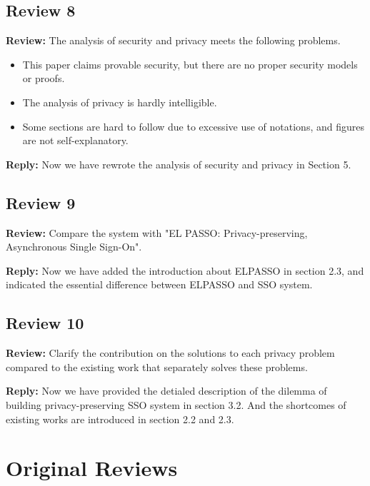 \documentclass[letterpaper,onecolumn,10pt]{article}
\begin{document}
\subsection*{Review 8}
\vspace{1mm}\noindent\textbf{Review:}
The analysis of security and privacy meets the following problems.
\begin{itemize}
 \item This paper claims provable security, but there are no proper security models or proofs.
 \item The analysis of privacy is hardly intelligible.
 \item Some sections are hard to follow due to excessive use of notations, and figures are not self-explanatory.
\end{itemize}

\vspace{1mm}\noindent\textbf{Reply:}
Now we have rewrote the analysis of security and privacy in Section 5.

\subsection*{Review 9}
\vspace{1mm}\noindent\textbf{Review:}
Compare the system with "EL PASSO: Privacy-preserving, Asynchronous Single Sign-On".

\vspace{1mm}\noindent\textbf{Reply:}
Now we have added the introduction about ELPASSO in section 2.3, and indicated the essential difference between ELPASSO and SSO system.  


\subsection*{Review 10}
\vspace{1mm}\noindent\textbf{Review:}
Clarify the contribution on the solutions to each privacy problem compared to the existing work that separately solves these problems.

\vspace{1mm}\noindent\textbf{Reply:}
Now we have provided the detialed description of the dilemma of building privacy-preserving SSO system in section 3.2. And the shortcomes of existing works are introduced in section 2.2 and 2.3.  


\newpage
\section*{Original Reviews}
\end{document}
